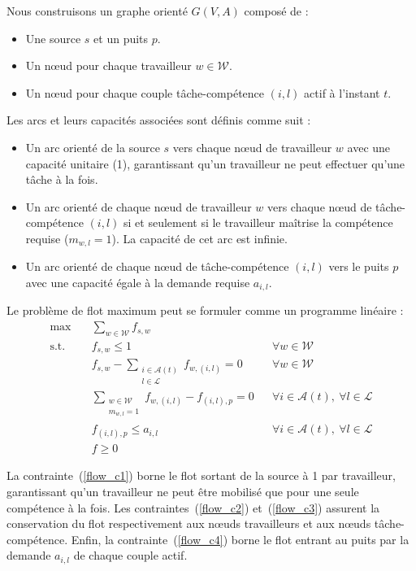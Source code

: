 \bigskip

Nous construisons un graphe orienté $G(V, A)$ composé de :
\begin{itemize}
    \item Une source $s$ et un puits $p$.
    \item Un nœud pour chaque travailleur $w \in \mathcal{W}$.
    \item Un nœud pour chaque couple tâche-compétence $(i, l)$ actif à l'instant $t$.
\end{itemize}

Les arcs et leurs capacités associées sont définis comme suit :
\begin{itemize}
    \item Un arc orienté de la source $s$ vers chaque nœud de travailleur $w$ avec une capacité unitaire (1), garantissant qu'un travailleur ne peut effectuer qu'une tâche à la fois.
    \item Un arc orienté de chaque nœud de travailleur $w$ vers chaque nœud de tâche-compétence $(i, l)$ si et seulement si le travailleur maîtrise la compétence requise ($m_{w,l} = 1$). La capacité de cet arc est infinie.
    \item Un arc orienté de chaque nœud de tâche-compétence $(i, l)$ vers le puits $p$ avec une capacité égale à la demande requise $a_{i,l}$.
\end{itemize}

Le problème de flot maximum peut se formuler comme un programme linéaire :
\begin{align}
    \max \quad & \sum_{w \in \mathcal{W}} f_{s,w} \label{flow_obj} \\
    \text{s.t.} \quad & f_{s,w} \leq 1 && \forall w \in \mathcal{W} \label{flow_c1} \\
    & f_{s,w} - \sum_{\substack{i \in \mathcal{A}(t) \\ l \in \mathcal{L}}} f_{w,(i,l)} = 0 && \forall w \in \mathcal{W} \label{flow_c2} \\
    & \sum_{\substack{w \in \mathcal{W} \\ m_{w,l} = 1}} f_{w,(i,l)} - f_{(i,l),p} = 0 && \forall i \in \mathcal{A}(t),\ \forall l \in \mathcal{L} \label{flow_c3} \\
    & f_{(i,l),p} \leq a_{i,l} && \forall i \in \mathcal{A}(t),\ \forall l \in \mathcal{L} \label{flow_c4} \\
    & f \geq 0
\end{align}

La contrainte~(\ref{flow_c1}) borne le flot sortant de la source à 1 par travailleur, garantissant qu'un travailleur ne peut être mobilisé que pour une seule compétence à la fois. Les contraintes~(\ref{flow_c2}) et~(\ref{flow_c3}) assurent la conservation du flot respectivement aux nœuds travailleurs et aux nœuds tâche-compétence. Enfin, la contrainte~(\ref{flow_c4}) borne le flot entrant au puits par la demande $a_{i,l}$ de chaque couple actif.

